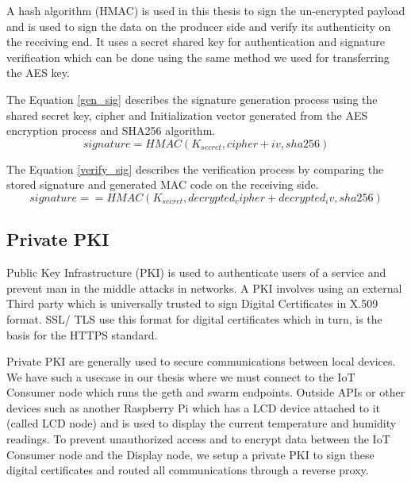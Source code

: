 \documentclass[11pt,openright]{report}
\begin{document}
A hash algorithm (HMAC) is used in this thesis to sign the un-encrypted payload and is used to sign the data on the producer side and verify its authenticity on the receiving end. It uses a secret shared key for authentication and signature verification which can be done using the same method we used for transferring the AES key. 

The Equation \ref{gen_sig} describes the signature generation process using the shared secret key, cipher and Initialization vector generated from the AES encryption process and SHA256 algorithm.
\begin{equation}\label{gen_sig}
    signature = {HMAC(K_{secret}, cipher + iv, sha256)}
\end{equation}

The Equation \ref{verify_sig} describes the verification process by comparing the stored signature and generated MAC code on the receiving side.
\begin{equation}\label{verify_sig}
    signature == {HMAC(K_{secret}, {decrypted_cipher} + {decrypted_iv}, sha256)}
\end{equation}

\subsection{Private PKI}
Public Key Infrastructure (PKI) is used to authenticate users of a service and prevent man in the middle attacks in networks. A PKI involves using an external Third party which is universally trusted to sign Digital Certificates in X.509 format. SSL/ TLS use this format for digital certificates which in turn, is the basis for the HTTPS standard.

Private PKI are generally used to secure communications between local devices. We have such a usecase in our thesis where we must connect to the IoT Consumer node which runs the geth and swarm endpoints. Outside APIs or other devices such as another Raspberry Pi which has a LCD device attached to it (called LCD node) and is used to display the current temperature and humidity readings. To prevent unauthorized access and to encrypt data between the IoT Consumer node and the Display node, we setup a private PKI to sign these digital certificates and routed all communications through a reverse proxy.
\end{document}
